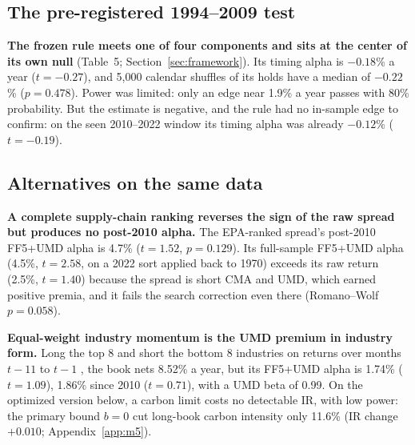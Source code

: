 \subsection{The pre-registered 1994--2009 test}
\label{sec:frozen}

\textbf{The frozen rule meets one of four components and sits at the center of its own null} (Table~5; Section~\ref{sec:framework}). Its timing alpha is $-0.18$\% a year ($t=-0.27$), and 5,000 calendar shuffles of its holds have a median of $-0.22$\% ($p=0.478$). Power was limited: only an edge near 1.9\% a year passes with 80\% probability. But the estimate is negative, and the rule had no in-sample edge to confirm: on the seen 2010--2022 window its timing alpha was already $-0.12$\% ($t=-0.19$).

\begin{table}[!tb]
\caption{The frozen 1994--2009 test: the pre-registered pass bar for the EMV-share rule and, for context, our team's own signal lagged one month. All four components had to pass; both signals fail.}
\label{tab:frozen}
\centering\scriptsize
\setlength{\tabcolsep}{3.5pt}

\end{table}

\subsection{Alternatives on the same data}
\label{sec:alternatives}

\textbf{A complete supply-chain ranking reverses the sign of the raw spread but produces no post-2010 alpha.} The EPA-ranked spread's post-2010 FF5+UMD alpha is 4.7\% ($t=1.52$, $p=0.129$). Its full-sample FF5+UMD alpha (4.5\%, $t=2.58$, on a 2022 sort applied back to 1970) exceeds its raw return (2.5\%, $t=1.40$) because the spread is short CMA and UMD, which earned positive premia, and it fails the search correction even there (Romano--Wolf $p=0.058$).

\textbf{Equal-weight industry momentum is the UMD premium in industry form.} Long the top 8 and short the bottom 8 industries on returns over months $t-11$ to $t-1$ \citep{mg1999}, the book nets 8.52\% a year, but its FF5+UMD alpha is 1.74\% ($t=1.09$), 1.86\% since 2010 ($t=0.71$), with a UMD beta of 0.99. On the optimized version below, a carbon limit costs no detectable IR, with low power: the primary bound $b=0$ cut long-book carbon intensity only 11.6\% (IR change $+0.010$; Appendix~\ref{app:m5}).

